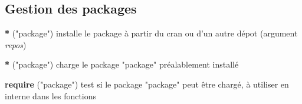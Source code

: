 \documentclass[11, a4paper, landscape]{article}
\newif\ifadvanced
\newcommand{\grasindex}[1]{\textbf{#1} \index{#1\textbf}}
\newcommand{\adv}[1]{\ifadvanced #1 \fi}
\begin{document}
\begin{multicols*}{3}
\subsection{Gestion des packages}

\grasindex*{install.packages}("package") \quad installe le package à partir du cran ou d'un autre dépot (argument \textit{repos})

\grasindex*{library}("package") \quad  charge le package "package" préalablement installé

\grasindex{require}("package") \quad  test si le package "package" peut être chargé, à utiliser en interne dans les fonctions

\adv{
  \grasindex{update.packages}("package") \quad  met à jour les packages installés

  \grasindex{remove.packages}("package") \quad  supprime les packages installés

  \grasindex{installed.packages}("package") \quad  liste les packages installés

  \grasindex{updateR}(F, T, T, F, T, F, T) \quad nécessite le package \texttt{installr}, permet une mise à jour de R en gardant les packages de l'ancienne version de R. \href{http://www.r-statistics.com/2013/03/updating-r-from-r-on-windows-using-the-installr-package/} {Plus d'infos}.

  \grasindex{revdep\_check}() \quad possible de résumer avec \grasindex{revdep\_check\_summary}.

  nompackage\grasindex{::}nomfunction \quad Appelle la fonction nomfunction du package nompackage. En particulier utile pour les fonctions cachées (\textit{e.g.} \textsc{plot.data.frame} du package \textsc{stats}). nompackage\grasindex{:::}nomfunction va chercher aussi les fonctions cachés du package (celle qui ne sont pas exportée dans le \textsc{namespace})
}

\adv{
  \subsection{ade4}

  \grasindex{table.value}(a) \quad  représentation graphique des valeurs de la matrice (très utile pour visualiser une matrice de distance)

  \grasindex{s.value}()

  \grasindex{dist.binary}(a)  \quad indice de similarité (\textit{e.g.} Jaccard). Attention, pour jaccard l'indice n'est pas le même que celui calculé avec vegdist (calcul strict dans vegan, on retrouve la même chose qu'à la main) à cause d'une transformation. Cependant les deux similarités sont strictement proportionnelles (relation non linéaire).

}
\end{multicols*}
\end{document}
